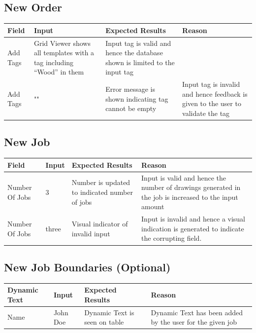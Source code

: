 \documentclass[oneside,openany,11pt,a4paper]{report}
\begin{document}
\subsection{New Order}
\begin{longtable}{|p{3cm}|p{3cm}|p{4.5cm}|p{4.5cm}|}
	\hline
	\rowcolor{gray!50}
	\textbf{Field} & \textbf{Input} &  \textbf{Expected Results} & \textbf{Reason} \\ \hline
	
	Add Tags & Grid Viewer shows all templates with a tag including “Wood” in them & Input tag is valid and hence the database shown is limited to the input tag \\ \hline
	
	Add Tags & "" & Error message is shown indicating tag cannot be empty & Input tag is invalid and hence feedback is given to the user to validate the tag \\ \hline
	
\end{longtable}

\subsection{New Job}
\begin{longtable}{|p{3cm}|p{3cm}|p{4.5cm}|p{4.5cm}|}
	\hline
	\rowcolor{gray!50}
	\textbf{Field} & \textbf{Input} &  \textbf{Expected Results} & \textbf{Reason} \\ \hline
	
	Number Of Jobs & 3 & Number is updated to indicated number of jobs & Input is valid and hence the number of drawings generated in the job is increased to the input amount \\ \hline
	
	Number Of Jobs & three & Visual indicator of invalid input & Input is invalid and hence a visual indication is generated to indicate the corrupting field. \\ \hline
	
\end{longtable}

\subsection{New Job Boundaries (Optional)}
\begin{longtable}{|p{3cm}|p{3cm}|p{4.5cm}|p{4.5cm}|}
	\hline
	\rowcolor{gray!50}
	\textbf{Dynamic Text} & \textbf{Input} &  \textbf{Expected Results} & \textbf{Reason} \\ \hline
	
	Name & John Doe &Dynamic Text is seen on table & Dynamic Text has been added by the user for the given job \\ \hline
	
\end{longtable}
\end{document}
